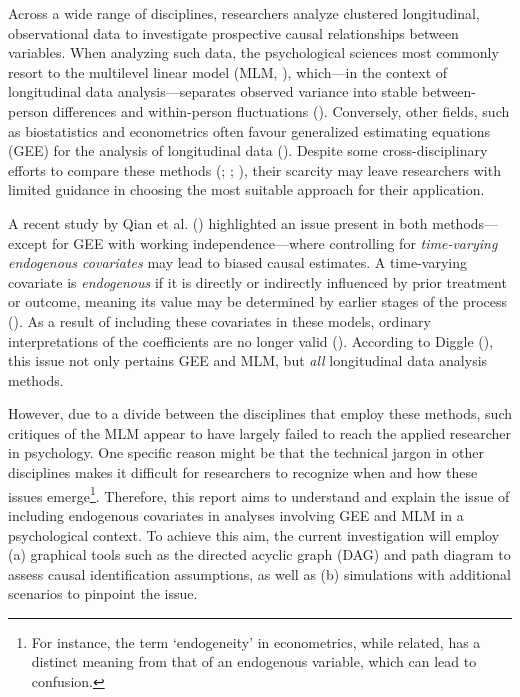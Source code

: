 \documentclass[
  12pt,
  a4paper,
]{article}
\begin{document}
Across a wide range of disciplines, researchers analyze clustered
longitudinal, observational data to investigate prospective causal
relationships between variables. When analyzing such data, the
psychological sciences most commonly resort to the multilevel linear
model (MLM, ),
which---in the context of longitudinal data analysis---separates
observed variance into stable between-person differences and
within-person fluctuations (). Conversely, other fields, such as biostatistics and
econometrics often favour generalized estimating equations (GEE) for the
analysis of longitudinal data (). Despite some cross-disciplinary efforts to compare these
methods (;
; ), their scarcity may leave researchers with limited
guidance in choosing the most suitable approach for their application.

A recent study by Qian et al. ()
highlighted an issue present in both methods---except for GEE with
working independence---where controlling for \emph{time-varying
endogenous covariates} may lead to biased causal estimates. A
time-varying covariate is \emph{endogenous} if it is directly or
indirectly influenced by prior treatment or outcome, meaning its value
may be determined by earlier stages of the process
(). As a result of including
these covariates in these models, ordinary interpretations of the
coefficients are no longer valid (). According to Diggle (),
this issue not only pertains GEE and MLM, but \emph{all} longitudinal
data analysis methods.

However, due to a divide between the disciplines that employ these
methods, such critiques of the MLM appear to have largely failed to
reach the applied researcher in psychology. One specific reason might be
that the technical jargon in other disciplines makes it difficult for
researchers to recognize when and how these issues emerge\footnote{For
  instance, the term `endogeneity' in econometrics, while related, has a
  distinct meaning from that of an endogenous variable, which can lead
  to confusion.}. Therefore, this report aims to understand and explain
the issue of including endogenous covariates in analyses involving GEE
and MLM in a psychological context. To achieve this aim, the current
investigation will employ (a) graphical tools such as the directed
acyclic graph (DAG) and path diagram to assess causal identification
assumptions, as well as (b) simulations with additional scenarios to
pinpoint the issue.
\end{document}
